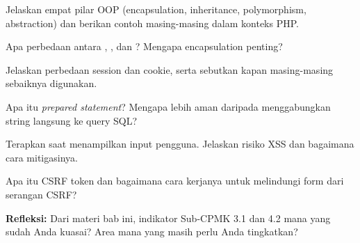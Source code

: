 \documentclass[../main.tex]{subfiles}
\begin{document}
\begin{latihan}
  \item Jelaskan empat pilar OOP (encapsulation, inheritance, polymorphism, abstraction) dan berikan contoh masing-masing dalam konteks PHP.
  \item Apa perbedaan antara , , dan ? Mengapa encapsulation penting?
  \item Jelaskan perbedaan session dan cookie, serta sebutkan kapan masing-masing sebaiknya digunakan.
  \item Apa itu \textit{prepared statement}? Mengapa lebih aman daripada menggabungkan string langsung ke query SQL?
  \item Terapkan  saat menampilkan input pengguna. Jelaskan risiko XSS dan bagaimana cara mitigasinya.
  \item Apa itu CSRF token dan bagaimana cara kerjanya untuk melindungi form dari serangan CSRF?
  \item \textbf{Refleksi:} Dari materi bab ini, indikator Sub-CPMK 3.1 dan 4.2 mana yang sudah Anda kuasai? Area mana yang masih perlu Anda tingkatkan?
\end{latihan}
\end{document}
